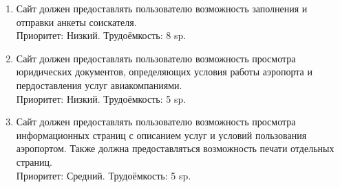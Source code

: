 \begin{enumerate}
      \item Сайт должен предоставлять пользователю возможность
            заполнения и отправки анкеты соискателя. \\
            Приоритет: Низкий. Трудоёмкость: 8 sp.

      \item Сайт должен предоставлять пользователю возможность
            просмотра юридических документов, определяющих
            условия работы аэропорта и пердоставления
            услуг авиакомпаниями. \\
            Приоритет: Низкий. Трудоёмкость: 5 sp.

      \item Сайт должен предоставлять пользователю возможность просмотра
            информационных страниц с описанием услуг и
            условий пользования аэропортом. Также должна
            предоставляться возможность печати отдельных
            страниц. \\
            Приоритет: Средний. Трудоёмкость: 5 sp.

\end{enumerate}
